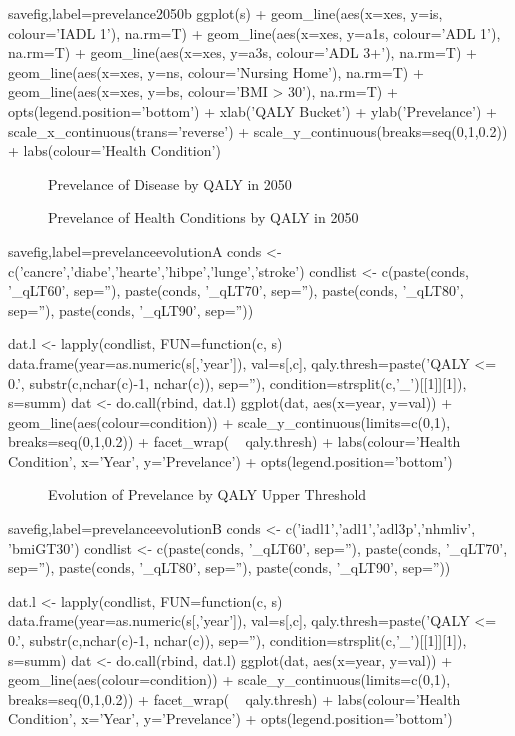 \documentclass{article}
\begin{document}
\begin{Rcode}{savefig,label=prevelance2050b}
ggplot(s) +
geom_line(aes(x=xes, y=is, colour='IADL 1'), na.rm=T) +
geom_line(aes(x=xes, y=a1s, colour='ADL 1'), na.rm=T) +
geom_line(aes(x=xes, y=a3s, colour='ADL 3+'), na.rm=T) +
geom_line(aes(x=xes, y=ns, colour='Nursing Home'), na.rm=T) +
geom_line(aes(x=xes, y=bs, colour='BMI > 30'), na.rm=T) +
opts(legend.position='bottom') +
xlab('QALY Bucket') +
ylab('Prevelance') +
scale_x_continuous(trans='reverse') +
scale_y_continuous(breaks=seq(0,1,0.2)) +
labs(colour='Health Condition')
\end{Rcode}

\begin{figure}[ht]
\centering
{}
\caption{Prevelance of Disease by QALY in 2050}
\end{figure}

\begin{figure}[ht]
\centering
{}
\caption{Prevelance of Health Conditions by QALY in 2050}
\end{figure}

\begin{Rcode}{savefig,label=prevelanceevolutionA}
conds <- c('cancre','diabe','hearte','hibpe','lunge','stroke')
condlist <- c(paste(conds, '_qLT60', sep=''), paste(conds, '_qLT70', sep=''), paste(conds, '_qLT80', sep=''), paste(conds, '_qLT90', sep=''))


dat.l <- lapply(condlist, FUN=function(c, s) data.frame(year=as.numeric(s[,'year']),
                                                        val=s[,c],
							qaly.thresh=paste('QALY <= 0.', substr(c,nchar(c)-1, nchar(c)), sep=''),
							condition=strsplit(c,'_')[[1]][1]), s=summ)
dat <- do.call(rbind, dat.l)
ggplot(dat, aes(x=year, y=val)) + 
geom_line(aes(colour=condition)) +
scale_y_continuous(limits=c(0,1), breaks=seq(0,1,0.2)) +
facet_wrap( ~ qaly.thresh) +
labs(colour='Health Condition', x='Year', y='Prevelance') +
opts(legend.position='bottom')
\end{Rcode}

\begin{figure}[ht]
\centering
{}
\caption{Evolution of Prevelance by QALY Upper Threshold}
\end{figure}

\begin{Rcode}{savefig,label=prevelanceevolutionB}
conds <- c('iadl1','adl1','adl3p','nhmliv', 'bmiGT30')
condlist <- c(paste(conds, '_qLT60', sep=''), paste(conds, '_qLT70', sep=''), paste(conds, '_qLT80', sep=''), paste(conds, '_qLT90', sep=''))


dat.l <- lapply(condlist, FUN=function(c, s) data.frame(year=as.numeric(s[,'year']),
                                                        val=s[,c],
							qaly.thresh=paste('QALY <= 0.', substr(c,nchar(c)-1, nchar(c)), sep=''),
							condition=strsplit(c,'_')[[1]][1]), s=summ)
dat <- do.call(rbind, dat.l)
ggplot(dat, aes(x=year, y=val)) + 
geom_line(aes(colour=condition)) +
scale_y_continuous(limits=c(0,1), breaks=seq(0,1,0.2)) +
facet_wrap( ~ qaly.thresh) +
labs(colour='Health Condition', x='Year', y='Prevelance') +
opts(legend.position='bottom')
\end{Rcode}
\end{document}
